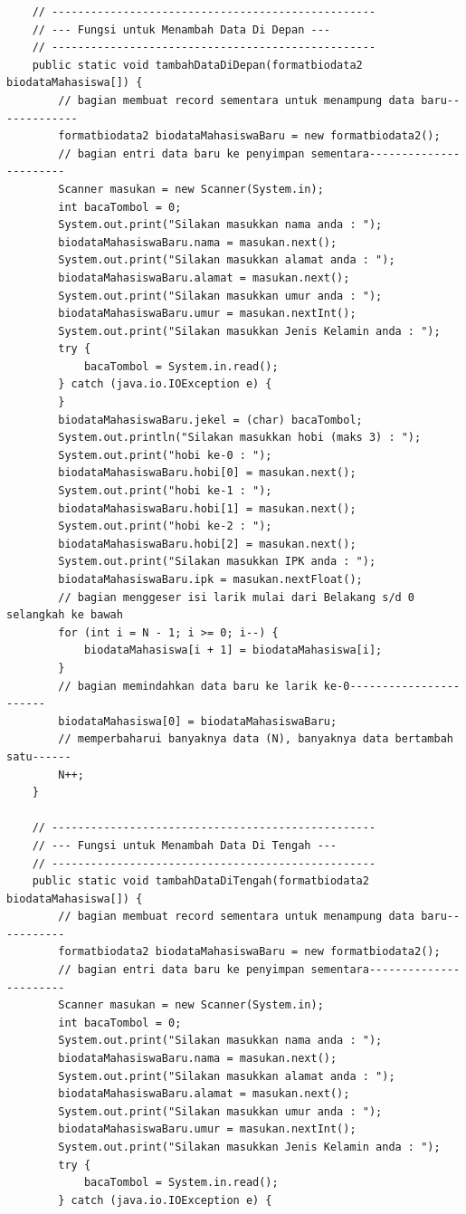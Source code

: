 \documentclass[a4paper,12pt]{article}
\begin{document}
\begin{lstlisting}
    // --------------------------------------------------
    // --- Fungsi untuk Menambah Data Di Depan ---
    // --------------------------------------------------
    public static void tambahDataDiDepan(formatbiodata2 biodataMahasiswa[]) {
        // bagian membuat record sementara untuk menampung data baru-------------
        formatbiodata2 biodataMahasiswaBaru = new formatbiodata2();
        // bagian entri data baru ke penyimpan sementara-----------------------
        Scanner masukan = new Scanner(System.in);
        int bacaTombol = 0;
        System.out.print("Silakan masukkan nama anda : ");
        biodataMahasiswaBaru.nama = masukan.next();
        System.out.print("Silakan masukkan alamat anda : ");
        biodataMahasiswaBaru.alamat = masukan.next();
        System.out.print("Silakan masukkan umur anda : ");
        biodataMahasiswaBaru.umur = masukan.nextInt();
        System.out.print("Silakan masukkan Jenis Kelamin anda : ");
        try {
            bacaTombol = System.in.read();
        } catch (java.io.IOException e) {
        }
        biodataMahasiswaBaru.jekel = (char) bacaTombol;
        System.out.println("Silakan masukkan hobi (maks 3) : ");
        System.out.print("hobi ke-0 : ");
        biodataMahasiswaBaru.hobi[0] = masukan.next();
        System.out.print("hobi ke-1 : ");
        biodataMahasiswaBaru.hobi[1] = masukan.next();
        System.out.print("hobi ke-2 : ");
        biodataMahasiswaBaru.hobi[2] = masukan.next();
        System.out.print("Silakan masukkan IPK anda : ");
        biodataMahasiswaBaru.ipk = masukan.nextFloat();
        // bagian menggeser isi larik mulai dari Belakang s/d 0 selangkah ke bawah
        for (int i = N - 1; i >= 0; i--) {
            biodataMahasiswa[i + 1] = biodataMahasiswa[i];
        }
        // bagian memindahkan data baru ke larik ke-0-----------------------
        biodataMahasiswa[0] = biodataMahasiswaBaru;
        // memperbaharui banyaknya data (N), banyaknya data bertambah satu------
        N++;
    }

    // --------------------------------------------------
    // --- Fungsi untuk Menambah Data Di Tengah ---
    // --------------------------------------------------
    public static void tambahDataDiTengah(formatbiodata2 biodataMahasiswa[]) {
        // bagian membuat record sementara untuk menampung data baru-----------
        formatbiodata2 biodataMahasiswaBaru = new formatbiodata2();
        // bagian entri data baru ke penyimpan sementara-----------------------
        Scanner masukan = new Scanner(System.in);
        int bacaTombol = 0;
        System.out.print("Silakan masukkan nama anda : ");
        biodataMahasiswaBaru.nama = masukan.next();
        System.out.print("Silakan masukkan alamat anda : ");
        biodataMahasiswaBaru.alamat = masukan.next();
        System.out.print("Silakan masukkan umur anda : ");
        biodataMahasiswaBaru.umur = masukan.nextInt();
        System.out.print("Silakan masukkan Jenis Kelamin anda : ");
        try {
            bacaTombol = System.in.read();
        } catch (java.io.IOException e) {


\end{lstlisting}
\end{document}
